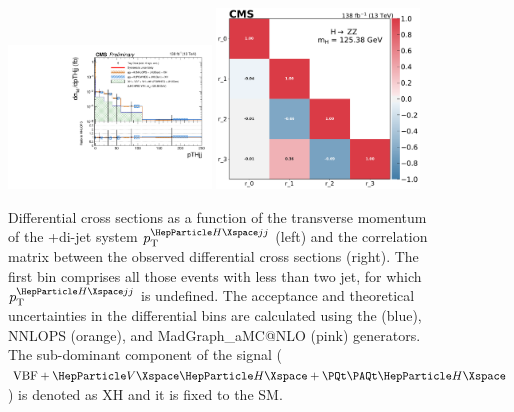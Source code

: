 \begin{center}
	\begin{figure}[!htb]
		\centering
		\includegraphics[width=0.48\textwidth]{Images/H4L/pTHjj_unfoldwith_SM_125_asimov.pdf}
		\includegraphics[width=0.48\textwidth]{Images/H4L/correlations/corr_pTHjj_v3.pdf}\\
		\caption{
			Differential cross sections as a function of the transverse momentum of the \PH+di-jet system $\pt^{\PH jj}$ (left) and the correlation matrix between the observed differential cross sections (right).
			The first bin comprises all those events with less than two jet, for which $\pt^{\PH jj}$  is undefined.
			The acceptance and theoretical uncertainties in the differential bins are calculated using the \POWHEG (blue), NNLOPS (orange), and MadGraph\_aMC@NLO (pink) generators.
			The sub-dominant component of the signal ($\VBF + \VH + \ttH$) is denoted as XH and it is fixed to the SM.
			\label{fig:fidPTHJJ}}
	\end{figure}
\end{center}

\clearpage


